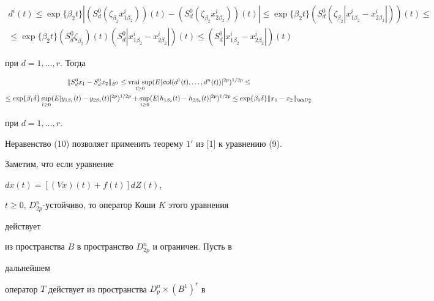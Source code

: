 \begin{pf}
\begin{multline*}
d^i(t)\le\exp\{\beta_2t\}|(S^0_d(\zeta_{\beta_2}x^i_{1\beta_2}))(t)- 


(S^0_d(\zeta_{\beta_2}x^i_{2\beta_2}))(t)|\le 


\exp\{\beta_2t\}(S^0_d(\zeta_{\beta_2}|x^i_{1\beta_2}- 


x^i_{2\beta_2}|))(t) \le \\ 


% 


\le\exp\{\beta_2t\}(S^0_d\zeta_{\beta_2})(t) 


(S^0_d|x^i_{1\beta_2}-x^i_{2\beta_2}|)(t)\le 


(S^0_d|x^i_{1\beta_2}-x^i_{2\beta_2}|)(t) 


\end{multline*} 


при $d=1,\dotsc,r$. Тогда 


\begin{multline*} 


\|S^0_d x_1-S^0_d x_2\|_{B^1}\le\vraisup_{t\ge0} 


(E|\col(d^1(t),\dotsc,d^n(t))|^{2p})^{1/2p}\le \\ 


% 


\le\exp\{\beta_1\delta\}\sup_{t\ge0}(E|y_{1\beta_1}(t)- 


y_{2\beta_1}(t)|^{2p})^{1/2p}+ 


\sup_{t\ge0}(E|h_{1\beta_2}(t)-h_{2\beta_2}(t)|^{2p})^{1/2p} \le  


\exp\{\beta_1\delta\}\|x_1-x_2\|_{\wh D^n_p} 


\end{multline*} 


при $d=1,\dotsc,r$. 


\end{pf} 


 


Неравенство (10) позволяет применить теорему $1'$ из [1] к уравнению (9). 


Заметим, что если уравнение 


$d x(t)=[(V x)(t)+f(t)]d Z(t)$, 


$t\ge0$, $D^n_{2p}$-устойчиво, то оператор Коши $K$ этого уравнения 


действует 


из пространства $B$ в пространство $D^n_{2p}$ и ограничен. Пусть в 


дальнейшем 


оператор $T$ действует из пространства $D^n_p\times(B^1)^r$ в 


